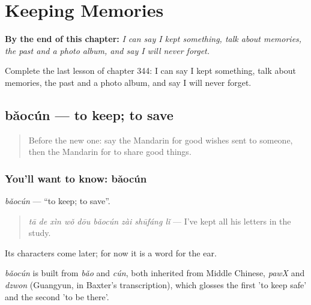 
\chapter{Keeping Memories}
\label{ch:zh-keeping-memories}

\begin{chapteropening}
\textbf{By the end of this chapter:} \emph{I can say I kept something, talk about memories, the past and a photo album, and say I will never forget.}

Complete the last lesson of chapter 344: I can say I kept something, talk about memories, the past and a photo album, and say I will never forget.
\end{chapteropening}

\section[bǎocún]{bǎocún — to keep; to save}

\label{lesson:ZH-C344-baocun}



\begin{quote}
Before the new one: say the Mandarin for good wishes sent to someone, then the Mandarin for to share good things.
\end{quote}

\subsection*{You'll want to know: bǎocún}
\emph{bǎocún} — \textquotedblleft{}to keep; to save\textquotedblright{}.

\begin{quote}
\emph{tā de xìn wǒ dōu bǎocún zài shūfáng lǐ} — I've kept all his letters in the study.
\end{quote}

Its characters come later; for now it is a word for the ear.

\begin{cousinweb}
\emph{bǎocún} is built from \emph{bǎo} and \emph{cún}, both inherited from Middle Chinese, \emph{pawX} and \emph{dzwon} (Guangyun, in Baxter's transcription), which glosses the first 'to keep safe' and the second 'to be there'.
\end{cousinweb}

